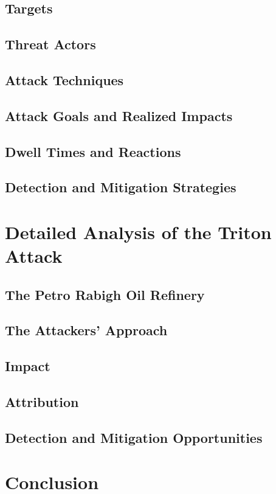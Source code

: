 \documentclass[runningheads]{llncs}
\begin{document}
\subsection{Targets}
\subsection{Threat Actors}
\subsection{Attack Techniques}
\subsection{Attack Goals and Realized Impacts}
\subsection{Dwell Times and Reactions}
\subsection{Detection and Mitigation Strategies}
\section{Detailed Analysis of the Triton Attack}
\subsection{The Petro Rabigh Oil Refinery}
\subsection{The Attackers' Approach}
\subsection{Impact}
\subsection{Attribution}
\subsection{Detection and Mitigation Opportunities}
\section{Conclusion}


%
%
%


\end{document}
